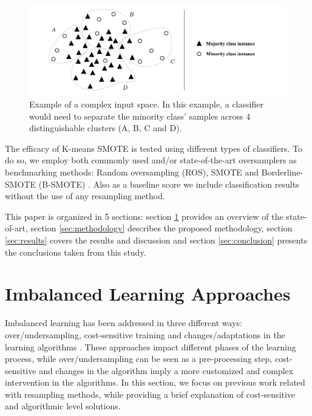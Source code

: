 \documentclass[preprint,12pt]{elsarticle}
\begin{document}
\begin{figure}[ht]
    \captionsetup{justification=centering}
	\caption{Example of a complex input space. In this example, a classifier
        would need to separate the minority class' samples across 4
        distinguishable clusters (A, B, C and D).
    \vspace{.2cm}}
	\label{fig:complex_input_space_example}
	\includegraphics[width=1\linewidth]{../analysis/complex_input_space_example}
\end{figure}

The efficacy of K-means SMOTE is tested using different
types of classifiers. To do so, we employ both commonly used and/or
state-of-the-art oversamplers as benchmarking methods: Random oversampling
(ROS), SMOTE and Borderline-SMOTE (B-SMOTE) \cite{Han2005}. Also
as a baseline score we include classification results without the use of any
resampling method.

This paper is organized in 5 sections: section \ref{sec:sota} provides an
overview of the state-of-art, section \ref{sec:methodology} describes the
proposed methodology, section \ref{sec:results} covers the results and
discussion and section \ref{sec:conclusion} presents the conclusions taken from
this study.

\section{Imbalanced Learning Approaches} \label{sec:sota}

Imbalanced learning has been addressed in three different ways:
over/undersampling, cost-sensitive training and changes/adaptations in the
learning algorithms \cite{Kaur2019}. These approaches impact different
phases of the learning process, while over/undersampling can be seen as a
pre-processing step, cost-sensitive and changes in the algorithm imply a more
customized and complex intervention in the algorithms. In this
section, we focus on previous work related with resampling methods, while
providing a brief explanation of cost-sensitive and algorithmic level solutions.
\end{document}
